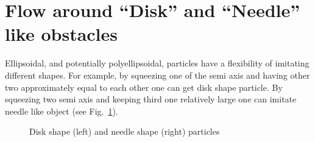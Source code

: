 \section{Flow around ``Disk'' and ``Needle'' like obstacles}
Ellipsoidal, and potentially polyellipsoidal, particles have a flexibility of imitating different shapes. For example, by squeezing one of the semi axis and having other two approximately equal to each other one can get disk shape particle. By squeezing two semi axis and keeping third one relatively large one can imitate needle like object (see Fig.~\ref{fig:lofi_shapes}).
\begin{figure}[t]
\begin{minipage}{0.5\linewidth}
\end{minipage}
\begin{minipage}{0.5\linewidth}
\end{minipage}
\caption{Disk shape (left) and needle shape (right) particles} \label{fig:lofi_shapes}
\end{figure}
